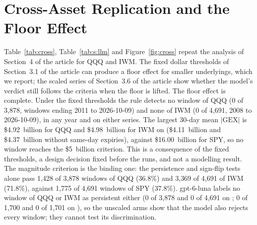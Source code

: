\section{Cross-Asset Replication and the Floor Effect}
\label{sup:cross}

Table~\ref{tab:cross}, Table~\ref{tab:s:llm} and Figure~\ref{fig:cross} repeat the analysis of Section~4 of the article for QQQ and IWM. The fixed dollar thresholds of Section~3.1 of the article can produce a floor effect for smaller underlyings, which we report; the scaled series of Section~3.6 of the article show whether the model's verdict still follows the criteria when the floor is lifted.
The floor effect is complete. Under the fixed thresholds the rule detects no window of QQQ (0 of 3{,}878, windows ending 2011 to 2026-10-09) and none of IWM (0 of 4{,}691, 2008 to 2026-10-09), in any year and on either series. The largest 30-day mean $|\mathrm{GEX}|$ is \$4.92~billion for QQQ and \$4.98~billion for IWM on  (\$4.11~billion and \$4.37~billion without same-day expiries), against \$16.00~billion for SPY, so no window reaches the \$5~billion criterion. This is a consequence of the fixed thresholds, a design decision fixed before the runs, and not a modelling result. The magnitude criterion is the binding one: the persistence and sign-flip tests alone pass 1{,}428 of 3{,}878 windows of QQQ (36.8\%) and 3{,}369 of 4{,}691 of IWM (71.8\%), against 1{,}775 of 4{,}691 windows of SPY (37.8\%). gpt-6-luna labels no window of QQQ or IWM as persistent either (0 of 3{,}878 and 0 of 4{,}691 on ; 0 of 1{,}700 and 0 of 1{,}701 on ), so the unscaled arms show that the model also rejects every window; they cannot test its discrimination.

